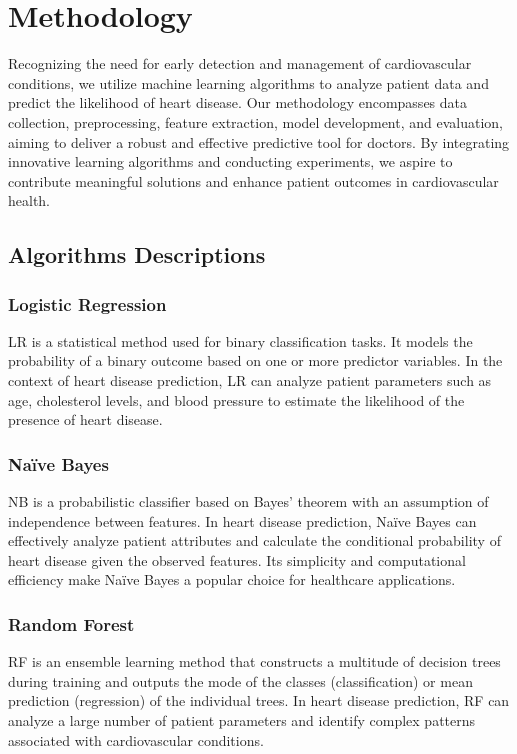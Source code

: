 \chapter{Methodology}
\label{ch:method} %
Recognizing the need for early detection and management of cardiovascular conditions, we utilize machine learning algorithms to analyze patient data and predict the likelihood of heart disease. Our methodology encompasses data collection, preprocessing, feature extraction, model development, and evaluation, aiming to deliver a robust and effective predictive tool for doctors. By integrating innovative learning algorithms and conducting experiments, we aspire to contribute meaningful solutions and enhance patient outcomes in cardiovascular health.

\section{Algorithms Descriptions}
\subsection{Logistic Regression}
LR is a statistical method used for binary classification tasks. It models the probability of a binary outcome based on one or more predictor variables. In the context of heart disease prediction, LR can analyze patient parameters such as age, cholesterol levels, and blood pressure to estimate the likelihood of the presence of heart disease.

\subsection{Naïve Bayes}
NB is a probabilistic classifier based on Bayes' theorem with an assumption of independence between features. In heart disease prediction, Naïve Bayes can effectively analyze patient attributes and calculate the conditional probability of heart disease given the observed features. Its simplicity and computational efficiency make Naïve Bayes a popular choice for healthcare applications.

\subsection{Random Forest}
RF is an ensemble learning method that constructs a multitude of decision trees during training and outputs the mode of the classes (classification) or mean prediction (regression) of the individual trees. In heart disease prediction, RF can analyze a large number of patient parameters and identify complex patterns associated with cardiovascular conditions.

